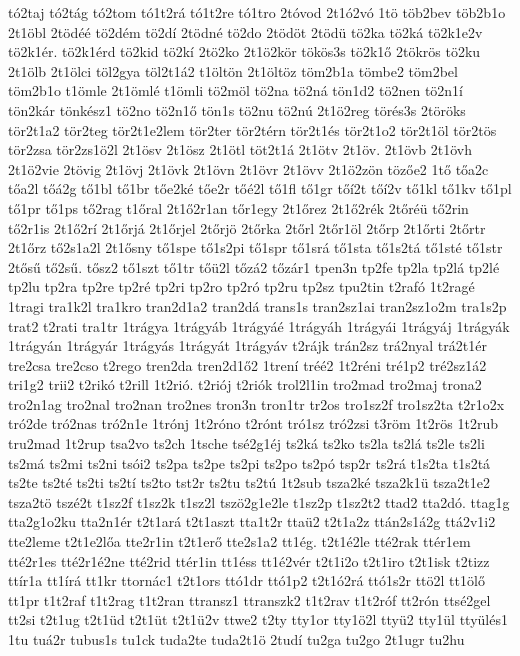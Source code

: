 {tó2taj
tó2tág
tó2tom
tó1t2rá
tó1t2re
tó1tro
2tóvod
2t1ó2vó
1tö
töb2bev
töb2b1o
2t1öbl
2tödéé
tö2dém
tö2dí
2tödné
tö2do
2tödöt
2tödü
tö2ka
tö2ká
tö2k1e2v
tö2k1ér.
tö2k1érd
tö2kid
tö2kí
2tö2ko
2t1ö2kör
tökös3s
tö2k1ő
2tökrös
tö2ku
2t1ölb
2t1ölci
töl2gya
töl2t1á2
t1öltön
2t1öltöz
töm2b1a
tömbe2
töm2bel
töm2b1o
t1ömle
2t1ömlé
t1ömli
tö2möl
tö2na
tö2ná
tön1d2
tö2nen
tö2n1í
tön2kár
tönkész1
tö2no
tö2n1ő
tön1s
tö2nu
tö2nú
2t1ö2reg
törés3s
2töröks
tör2t1a2
tör2teg
tör2t1e2lem
tör2ter
tör2térn
tör2t1és
tör2t1o2
tör2t1öl
tör2tös
tör2zsa
tör2zs1ö2l
2t1ösv
2t1ösz
2t1ötl
töt2t1á
2t1ötv
2t1öv.
2t1övb
2t1övh
2t1ö2vie
2tövig
2t1övj
2t1övk
2t1övn
2t1övr
2t1övv
2t1ö2zön
tözőe2
1tő
tőa2c
tőa2l
tőá2g
tő1bl
tő1br
tőe2ké
tőe2r
tőé2l
tő1fl
tő1gr
tőí2t
tőí2v
tő1kl
tő1kv
tő1pl
tő1pr
tő1ps
tő2rag
t1őral
2t1ő2r1an
tőr1egy
2t1őrez
2t1ő2rék
2tőréü
tő2rin
tő2r1is
2t1ő2rí
2t1őrjá
2t1őrjel
2tőrjö
2tőrka
2tőrl
2tőr1öl
2tőrp
2t1őrti
2tőrtr
2t1őrz
tő2s1a2l
2t1ősny
tő1spe
tő1s2pi
tő1spr
tő1srá
tő1sta
tő1s2tá
tő1sté
tő1str
2tősű
tő2sű.
tősz2
tő1szt
tő1tr
tőü2l
tőzá2
tőzár1
tpen3n
tp2fe
tp2la
tp2lá
tp2lé
tp2lu
tp2ra
tp2re
tp2ré
tp2ri
tp2ro
tp2ró
tp2ru
tp2sz
tpu2tin
t2rafó
1t2ragé
1tragi
tra1k2l
tra1kro
tran2d1a2
tran2dá
trans1s
tran2sz1ai
tran2sz1o2m
tra1s2p
trat2
t2rati
tra1tr
1trágya
1trágyáb
1trágyáé
1trágyáh
1trágyái
1trágyáj
1trágyák
1trágyán
1trágyár
1trágyás
1trágyát
1trágyáv
t2rájk
trán2sz
trá2nyal
trá2t1ér
tre2csa
tre2cso
t2rego
tren2da
tren2d1ő2
1trení
tréé2
1t2réni
tré1p2
tré2sz1á2
tri1g2
trii2
t2rikó
t2rill
1t2rió.
t2riój
t2riók
trol2l1in
tro2mad
tro2maj
trona2
tro2n1ag
tro2nal
tro2nan
tro2nes
tron3n
tron1tr
tr2os
tro1sz2f
tro1sz2ta
t2r1o2x
tró2de
tró2nas
tró2n1e
1trónj
1t2róno
t2rónt
tró1sz
tró2zsi
t3röm
1t2rös
1t2rub
tru2mad
1t2rup
tsa2vo
ts2ch
1tsche
tsé2g1éj
ts2ká
ts2ko
ts2la
ts2lá
ts2le
ts2li
ts2má
ts2mi
ts2ni
tsói2
ts2pa
ts2pe
ts2pi
ts2po
ts2pó
tsp2r
ts2rá
t1s2ta
t1s2tá
ts2te
ts2té
ts2ti
ts2tí
ts2to
tst2r
ts2tu
ts2tú
1t2sub
tsza2ké
tsza2k1ü
tsza2t1e2
tsza2tö
tszé2t
t1sz2f
t1sz2k
t1sz2l
tszö2g1e2le
t1sz2p
t1sz2t2
ttad2
tta2dó.
ttag1g
tta2g1o2ku
tta2n1ér
t2t1ará
t2t1aszt
tta1t2r
ttaü2
t2t1a2z
ttán2s1á2g
ttá2v1i2
tte2leme
t2t1e2lőa
tte2r1in
t2t1erő
tte2s1a2
tt1ég.
t2t1é2le
tté2rak
ttér1em
tté2r1es
tté2r1é2ne
tté2rid
ttér1in
tt1éss
tt1é2vér
t2t1i2o
t2t1iro
t2t1isk
t2tizz
ttír1a
tt1írá
tt1kr
ttornác1
t2t1ors
ttó1dr
ttó1p2
t2t1ó2rá
ttó1s2r
ttö2l
tt1ölő
tt1pr
t1t2raf
t1t2rag
t1t2ran
ttransz1
ttranszk2
t1t2rav
t1t2róf
tt2rón
ttsé2gel
tt2si
t2t1ug
t2t1üd
t2t1üt
t2t1ü2v
ttwe2
t2ty
tty1or
tty1ö2l
ttyü2
tty1ül
ttyülés1
1tu
tuá2r
tubus1s
tu1ck
tuda2te
tuda2t1ö
2tudí
tu2ga
tu2go
2t1ugr
tu2hu
}
